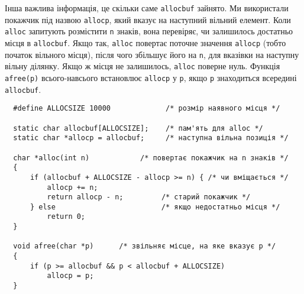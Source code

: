 \documentclass[a4paper,12pt]{book}
\begin{document}
  Інша важлива інформація, це скільки саме \texttt{allocbuf} зайнято. Ми використали
  покажчик під назвою \texttt{allocp}, який вказує на наступний вільний елемент. Коли
  \texttt{alloc} запитують розмістити \texttt{n} знаків, вона перевіряє, чи залишилось
  достатньо місця в \texttt{allocbuf}. Якщо так, \texttt{alloc} повертає поточне значення
  \texttt{allocp} (тобто початок вільного місця), після чого збільшує його на \texttt{n},
  для вказівки на наступну вільну ділянку. Якщо ж місця не залишилось, \texttt{alloc}
  поверне нуль. Функція \texttt{afree(p)} всього-навсього встановлює \texttt{allocp} у
  \texttt{p}, якщо \texttt{p} знаходиться всередині \texttt{allocbuf}.
  \begin{verbatim}
  #define ALLOCSIZE 10000             /* розмір наявного місця */

  static char allocbuf[ALLOCSIZE];    /* пам'ять для alloc */
  static char *allocp = allocbuf;     /* наступна вільна позиція */

  char *alloc(int n)            /* повертає покажчик на n знаків */
  {
      if (allocbuf + ALLOCSIZE - allocp >= n) { /* чи вміщається */
          allocp += n;
          return allocp - n;         /* старий покажчик */
      } else                         /* якщо недостатньо місця */
          return 0;
  }

  void afree(char *p)      /* звільняє місце, на яке вказує p */
  {
      if (p >= allocbuf && p < allocbuf + ALLOCSIZE)
          allocp = p;
  }
  \end{verbatim}
\end{document}
